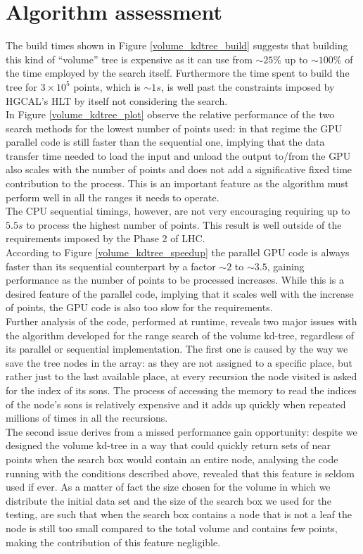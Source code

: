 \section{Algorithm assessment}\label{sec:volumeKdAssessment}
The build times shown in Figure \ref{volume_kdtree_build} suggests that building this kind of ``volume'' tree is expensive as it can use from $\sim 25\%$ up to $\sim 100\%$ of the time employed by the search itself. Furthermore the time spent to build the tree for $3 \times 10^{5}$ points, which is $\sim 1\unit{s}$, is well past the constraints imposed by HGCAL's HLT by itself not considering the search.\\
In Figure \ref{volume_kdtree_plot} observe the relative performance of the two search methods for the lowest number of points used: in that regime the GPU parallel code is still faster than the sequential one, implying that the data transfer time needed to load the input and unload the output to/from the GPU also scales with the number of points and does not add a significative fixed time contribution to the process. This is an important feature as the algorithm must perform well in all the ranges it needs to operate.\\
The CPU sequential timings, however, are not very encouraging requiring up to $5.5 \unit{s}$ to process the highest number of points. This result is well outside of the requirements imposed by the Phase 2 of LHC.\\
According to Figure \ref{volume_kdtree_speedup} the parallel GPU code is always faster than its sequential counterpart by a factor $\sim 2$ to $\sim 3.5$, gaining performance as the number of points to be processed increases. While this is a desired feature of the parallel code, implying that it scales well with the increase of points, the GPU code is also too slow for the requirements.\\
Further analysis of the code, performed at runtime, reveals two major issues with the algorithm developed for the range search of the volume kd-tree, regardless of its parallel or sequential implementation. The first one is caused by the way we save the tree nodes in the array: as they are not assigned to a specific place, but rather just to the last available place, at every recursion the node visited is asked for the index of its sons. The process of accessing the memory to read the indices of the node's sons is relatively expensive and it adds up quickly when repeated millions of times in all the recursions.\\
The second issue derives from a missed performance gain opportunity: despite we designed the volume kd-tree in a way that could quickly return sets of near points when the search box would contain an entire node, analysing the code running with the conditions described above, revealed that this feature is seldom used if ever. As a matter of fact the size chosen for the volume in which we distribute the initial data set and the size of the search box we used for the testing, are such that when the search box contains a node that is not a leaf the node is still too small compared to the total volume and contains few points, making the contribution of this feature negligible.\\
